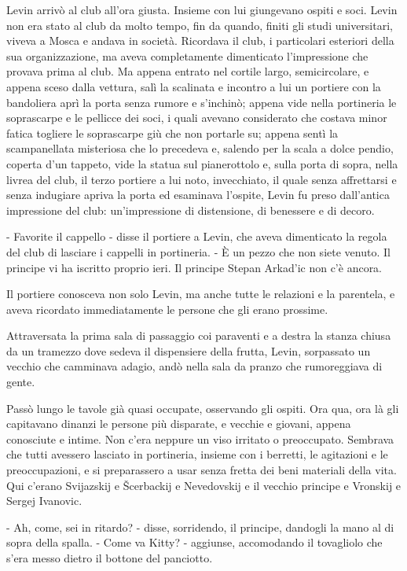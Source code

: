 Levin arrivò al club all'ora giusta. Insieme con lui giungevano ospiti e soci. Levin non era stato al club da molto tempo, fin da quando, finiti gli studi universitari, viveva a Mosca e andava in società. Ricordava il club, i particolari esteriori della sua organizzazione, ma aveva completamente dimenticato l'impressione che provava prima al club. Ma appena entrato nel cortile largo, semicircolare, e appena sceso dalla vettura, salì la scalinata e incontro a lui un portiere con la bandoliera aprì la porta senza rumore e s'inchinò; appena vide nella portineria le soprascarpe e le pellicce dei soci, i quali avevano considerato che costava minor fatica togliere le soprascarpe giù che non portarle su; appena sentì la scampanellata misteriosa che lo precedeva e, salendo per la scala a dolce pendio, coperta d'un tappeto, vide la statua sul pianerottolo e, sulla porta di sopra, nella livrea del club, il terzo portiere a lui noto, invecchiato, il quale senza affrettarsi e senza indugiare apriva la porta ed esaminava l'ospite, Levin fu preso dall'antica impressione del club: un'impressione di distensione, di benessere e di decoro. 

- Favorite il cappello - disse il portiere a Levin, che aveva dimenticato la regola del club di lasciare i cappelli in portineria. - È un pezzo che non siete venuto. Il principe vi ha iscritto proprio ieri. Il principe Stepan Arkad'ic non c'è ancora. 

Il portiere conosceva non solo Levin, ma anche tutte le relazioni e la parentela, e aveva ricordato immediatamente le persone che gli erano prossime. 

Attraversata la prima sala di passaggio coi paraventi e a destra la stanza chiusa da un tramezzo dove sedeva il dispensiere della frutta, Levin, sorpassato un vecchio che camminava adagio, andò nella sala da pranzo che rumoreggiava di gente. 

Passò lungo le tavole già quasi occupate, osservando gli ospiti. Ora qua, ora là gli capitavano dinanzi le persone più disparate, e vecchie e giovani, appena conosciute e intime. Non c'era neppure un viso irritato o preoccupato. Sembrava che tutti avessero lasciato in portineria, insieme con i berretti, le agitazioni e le preoccupazioni, e si preparassero a usar senza fretta dei beni materiali della vita. Qui c'erano Svijazskij e Šcerbackij e Nevedovskij e il vecchio principe e Vronskij e Sergej Ivanovic. 

- Ah, come, sei in ritardo? - disse, sorridendo, il principe, dandogli la mano al di sopra della spalla. - Come va Kitty? - aggiunse, accomodando il tovagliolo che s'era messo dietro il bottone del panciotto. 

